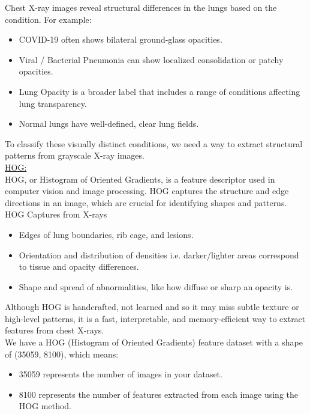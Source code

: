 \documentclass{article}
\begin{document}
Chest X-ray images reveal structural differences in the lungs based on the condition. For example:
\begin{itemize}
    \item COVID-19 often shows bilateral ground-glass opacities.
    \item Viral / Bacterial Pneumonia can show localized consolidation or patchy opacities.
    \item Lung Opacity is a broader label that includes a range of conditions affecting lung transparency.
    \item Normal lungs have well-defined, clear lung fields.
\end{itemize}

\vspace{0.5cm}

To classify these visually distinct conditions, we need a way to extract structural patterns from grayscale X-ray images.\\

\noindent \underline{HOG:}
\vspace{0.5cm}\\
HOG, or Histogram of Oriented Gradients, is a feature descriptor used in computer vision and image processing.  
HOG captures the structure and edge directions in an image, which are crucial for identifying shapes and patterns.
\\

HOG Captures from X-rays

\begin{itemize}
     \item Edges of lung boundaries, rib cage, and lesions.
     \item Orientation and distribution of densities i.e. darker/lighter areas correspond to tissue and opacity differences.
     \item Shape and spread of abnormalities, like how diffuse or sharp an opacity is.
\end{itemize}
Although HOG is handcrafted, not learned  and  so it may miss subtle texture or high-level patterns, it is a fast, interpretable, and memory-efficient way to 
extract features from chest X-rays. \\
We have a HOG (Histogram of Oriented Gradients) feature dataset with a shape of (35059, 8100), which means:
\begin{itemize}
    \item 35059 represents the number of images in your dataset.
    \item 8100 represents the number of features extracted from each image using the HOG method.
\end{itemize}
	
\end{document}
